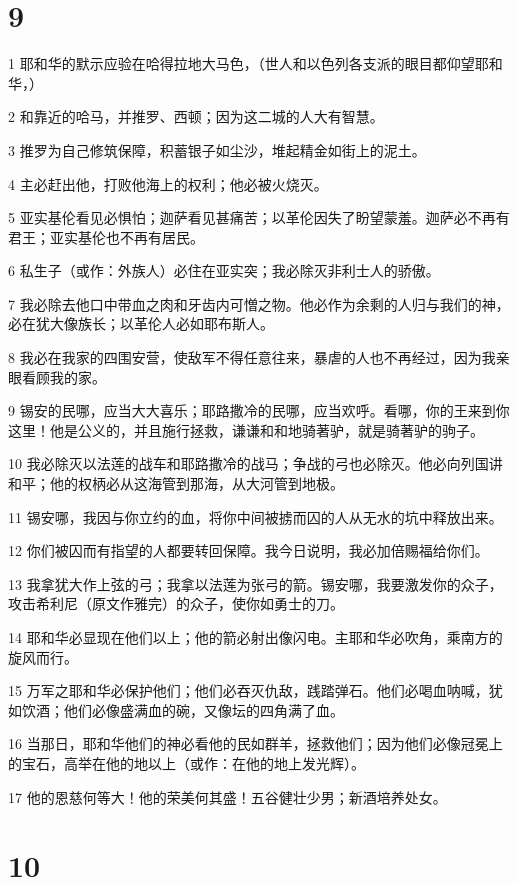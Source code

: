 \chapter{9}

\par 1 耶和华的默示应验在哈得拉地大马色，（世人和以色列各支派的眼目都仰望耶和华，）
\par 2 和靠近的哈马，并推罗、西顿；因为这二城的人大有智慧。
\par 3 推罗为自己修筑保障，积蓄银子如尘沙，堆起精金如街上的泥土。
\par 4 主必赶出他，打败他海上的权利；他必被火烧灭。
\par 5 亚实基伦看见必惧怕；迦萨看见甚痛苦；以革伦因失了盼望蒙羞。迦萨必不再有君王；亚实基伦也不再有居民。
\par 6 私生子（或作：外族人）必住在亚实突；我必除灭非利士人的骄傲。
\par 7 我必除去他口中带血之肉和牙齿内可憎之物。他必作为余剩的人归与我们的神，必在犹大像族长；以革伦人必如耶布斯人。
\par 8 我必在我家的四围安营，使敌军不得任意往来，暴虐的人也不再经过，因为我亲眼看顾我的家。
\par 9 锡安的民哪，应当大大喜乐；耶路撒冷的民哪，应当欢呼。看哪，你的王来到你这里！他是公义的，并且施行拯救，谦谦和和地骑著驴，就是骑著驴的驹子。
\par 10 我必除灭以法莲的战车和耶路撒冷的战马；争战的弓也必除灭。他必向列国讲和平；他的权柄必从这海管到那海，从大河管到地极。
\par 11 锡安哪，我因与你立约的血，将你中间被掳而囚的人从无水的坑中释放出来。
\par 12 你们被囚而有指望的人都要转回保障。我今日说明，我必加倍赐福给你们。
\par 13 我拿犹大作上弦的弓；我拿以法莲为张弓的箭。锡安哪，我要激发你的众子，攻击希利尼（原文作雅完）的众子，使你如勇士的刀。
\par 14 耶和华必显现在他们以上；他的箭必射出像闪电。主耶和华必吹角，乘南方的旋风而行。
\par 15 万军之耶和华必保护他们；他们必吞灭仇敌，践踏弹石。他们必喝血呐喊，犹如饮酒；他们必像盛满血的碗，又像坛的四角满了血。
\par 16 当那日，耶和华他们的神必看他的民如群羊，拯救他们；因为他们必像冠冕上的宝石，高举在他的地以上（或作：在他的地上发光辉）。
\par 17 他的恩慈何等大！他的荣美何其盛！五谷健壮少男；新酒培养处女。

\chapter{10}

